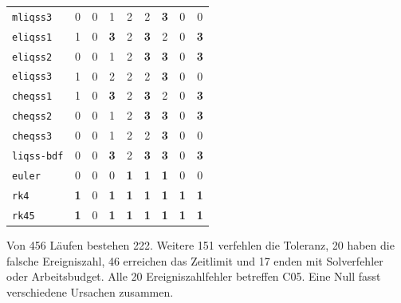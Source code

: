 {\begin{tabular*}{\linewidth}{@{}l@{\extracolsep{\fill}}*{8}{c}@{}}
\texttt{mliqss3} & {\color{mute}0} & {\color{mute}0} & 1 & 2 & 2 & \textbf{\color{sea}3} & {\color{mute}0} & {\color{mute}0} \\
\addlinespace[2pt]
\texttt{eliqss1} & 1 & {\color{mute}0} & \textbf{\color{sea}3} & 2 & \textbf{\color{sea}3} & 2 & {\color{mute}0} & \textbf{\color{sea}3} \\
\texttt{eliqss2} & {\color{mute}0} & {\color{mute}0} & 1 & 2 & \textbf{\color{sea}3} & \textbf{\color{sea}3} & {\color{mute}0} & \textbf{\color{sea}3} \\
\texttt{eliqss3} & 1 & {\color{mute}0} & 2 & 2 & 2 & \textbf{\color{sea}3} & {\color{mute}0} & {\color{mute}0} \\
\addlinespace[2pt]
\texttt{cheqss1} & 1 & {\color{mute}0} & \textbf{\color{sea}3} & 2 & \textbf{\color{sea}3} & 2 & {\color{mute}0} & \textbf{\color{sea}3} \\
\texttt{cheqss2} & {\color{mute}0} & {\color{mute}0} & 1 & 2 & \textbf{\color{sea}3} & \textbf{\color{sea}3} & {\color{mute}0} & \textbf{\color{sea}3} \\
\texttt{cheqss3} & {\color{mute}0} & {\color{mute}0} & 1 & 2 & 2 & \textbf{\color{sea}3} & {\color{mute}0} & {\color{mute}0} \\
\addlinespace[2pt]
\texttt{liqss-bdf} & {\color{mute}0} & {\color{mute}0} & \textbf{\color{sea}3} & 2 & \textbf{\color{sea}3} & \textbf{\color{sea}3} & {\color{mute}0} & \textbf{\color{sea}3} \\
\addlinespace[2pt]
\midrule
\texttt{euler} & {\color{mute}0} & {\color{mute}0} & {\color{mute}0} & \textbf{\color{sea}1} & \textbf{\color{sea}1} & \textbf{\color{sea}1} & {\color{mute}0} & {\color{mute}0} \\
\texttt{rk4} & \textbf{\color{sea}1} & {\color{mute}0} & \textbf{\color{sea}1} & \textbf{\color{sea}1} & \textbf{\color{sea}1} & \textbf{\color{sea}1} & \textbf{\color{sea}1} & \textbf{\color{sea}1} \\
\texttt{rk45} & \textbf{\color{sea}1} & {\color{mute}0} & \textbf{\color{sea}1} & \textbf{\color{sea}1} & \textbf{\color{sea}1} & \textbf{\color{sea}1} & \textbf{\color{sea}1} & \textbf{\color{sea}1} \\
\bottomrule\end{tabular*}\par}
Von 456 Läufen bestehen 222. Weitere 151 verfehlen die Toleranz, 20 haben die falsche Ereigniszahl, 46 erreichen das Zeitlimit und 17 enden mit Solverfehler oder Arbeitsbudget. Alle 20 Ereigniszahlfehler betreffen C05. Eine Null fasst verschiedene Ursachen zusammen.

